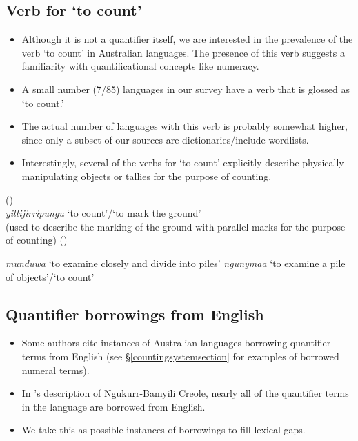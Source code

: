 \documentclass{article}
\makeatletter
\newcommand{\ofy}{/85} %
\makeatother
\begin{document}
\subsection{Verb for `to count'}

\begin{itemize}
\item Although it is not a quantifier itself, we are interested in the prevalence of the verb `to count' in Australian languages. The presence of this verb suggests a familiarity with quantificational concepts like numeracy.
\item A small number (7\ofy) languages in our survey have a verb that is glossed as `to count.'

\item The actual number of languages with this verb is probably somewhat higher, since only a subset of our sources are dictionaries/include wordlists.
\item Interestingly, several of the verbs for `to count' explicitly describe physically manipulating objects or tallies for the purpose of counting.
\end{itemize}

\begin{exe}
 (\citealt[179]{pintupi77})\\
\textit{yiltijirripungu} `to count'/`to mark the ground'\\
(used to describe the marking of the ground with parallel marks for the purpose of counting)
 (\citealt{heath84})
\begin{xlist}
\ex \textit{munduwa} `to examine closely and divide into piles' 
\ex \textit{ngunymaa} `to examine a pile of objects'/`to count'
\end{xlist}
\end{exe} 

\subsection{Quantifier borrowings from English}

\begin{itemize}
\item Some authors cite instances of Australian languages borrowing quantifier terms from English (see \S\ref{countingsystemsection} for examples of borrowed numeral terms).
\item In \cite{sandefur79}'s description of Ngukurr-Bamyili Creole, nearly all of the quantifier terms in the language are borrowed from English.
\item We take this as possible instances of borrowings to fill lexical gaps.
\end{itemize}
\end{document}
